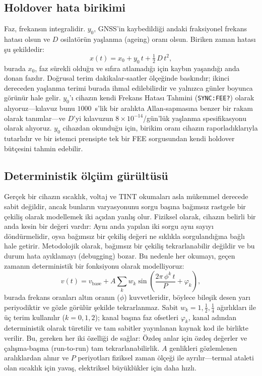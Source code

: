 \documentclass[conference]{IEEEtran}
\begin{document}
\subsection{Holdover hata birikimi}
Faz, frekansın integralidir. $y_0$, GNSS'in kaybedildiği andaki fraksiyonel frekans hatası olsun ve $D$ osilatörün yaşlanma (ageing) oranı olsun. Biriken zaman hatası şu şekildedir:
\begin{equation}
x(t) = x_0 + y_0\,t + \tfrac{1}{2}\,D\,t^{2},
\label{eq:holdover}
\end{equation}
burada $x_0$, faz sürekli olduğu ve sıfıra atlamadığı için kaybın yaşandığı anda donan fazdır. Doğrusal terim dakikalar-saatler ölçeğinde baskındır; ikinci dereceden yaşlanma terimi burada ihmal edilebilirdir ve yalnızca günler boyunca görünür hale gelir. $y_0$'ı cihazın kendi Frekans Hatası Tahmini (\texttt{SYNC:FEE?}) olarak alıyoruz---kılavuz bunu $1000$~s'lik bir aralıkta Allan-sapmasına benzer bir rakam olarak tanımlar---ve $D$'yi kılavuzun $8\times10^{-14}$/gün'lük yaşlanma spesifikasyonu olarak alıyoruz. $y_0$ cihazdan okunduğu için, birikim oranı cihazın raporladıklarıyla tutarlıdır ve bir istemci prensipte tek bir FEE sorgusundan kendi holdover bütçesini tahmin edebilir.

\subsection{Deterministik ölçüm gürültüsü}
Gerçek bir cihazın sıcaklık, voltaj ve TINT okumaları asla mükemmel derecede sabit değildir, ancak bunların varyasyonunu sorgu başına bağımsız rastgele bir çekiliş olarak modellemek iki açıdan yanlış olur. Fiziksel olarak, cihazın belirli bir anda kesin bir değeri vardır: Aynı anda yapılan iki sorgu aynı sayıyı döndürmelidir, oysa bağımsız bir çekiliş değeri ne sıklıkla sorgulandığına bağlı hale getirir. Metodolojik olarak, bağımsız bir çekiliş tekrarlanabilir değildir ve bu durum hata ayıklamayı (debugging) bozar. Bu nedenle her okumayı, geçen zamanın deterministik bir fonksiyonu olarak modelliyoruz:
\begin{equation}
v(t) = v_{\mathrm{base}} + A \sum_{k} w_k
       \sin\!\left(\frac{2\pi\,\phi^{k}\,t}{P} + \varphi_k\right),
\label{eq:noise}
\end{equation}
burada frekans oranları altın oranın ($\phi$) kuvvetleridir, böylece bileşik desen yarı periyodiktir ve gözle görülür şekilde tekrarlanmaz. Sabit $w_k=1,\tfrac12,\tfrac14$ ağırlıkları ile üç terim kullanılır ($k=0,1,2$); kanal başına faz ofsetleri $\varphi_k$, kanal adından deterministik olarak türetilir ve tam sabitler yayınlanan kaynak kod ile birlikte verilir. Bu, gereken her iki özelliği de sağlar: Özdeş anlar için özdeş değerler ve çalışma-başına (run-to-run) tam tekrarlanabilirlik. $A$ genlikleri gözlemlenen aralıklardan alınır ve $P$ periyotları fiziksel zaman ölçeği ile ayrılır---termal ataleti olan sıcaklık için yavaş, elektriksel büyüklükler için daha hızlı.
\end{document}
